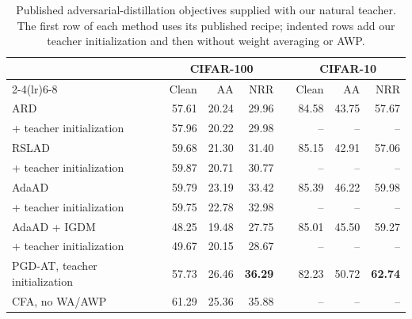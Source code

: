 \begin{table}[!htbp]
  \centering \small \setlength{\tabcolsep}{4pt}
  \caption{Published adversarial-distillation objectives supplied with our natural teacher. The first
  row of each method uses its published recipe; indented rows add our teacher initialization and then
  without weight averaging or AWP.}
  \label{tab:natteacher}
  \begin{tabular}{lrrrcrrr}
    \toprule
    & \multicolumn{3}{c}{CIFAR-100} && \multicolumn{3}{c}{CIFAR-10} \\
    \cmidrule(lr){2-4}\cmidrule(lr){6-8}
    & Clean & AA & NRR && Clean & AA & NRR \\
    \midrule
    ARD & 57.61 & 20.24 & 29.96 && 84.58 & 43.75 & 57.67 \\
    \quad + teacher initialization & 57.96 & 20.22 & 29.98 && -- & -- & -- \\
    RSLAD & 59.68 & 21.30 & 31.40 && 85.15 & 42.91 & 57.06 \\
    \quad + teacher initialization & 59.87 & 20.71 & 30.77 && -- & -- & -- \\
    AdaAD & 59.79 & 23.19 & 33.42 && 85.39 & 46.22 & 59.98 \\
    \quad + teacher initialization & 59.75 & 22.78 & 32.98 && -- & -- & -- \\
    AdaAD + IGDM & 48.25 & 19.48 & 27.75 && 85.01 & 45.50 & 59.27 \\
    \quad + teacher initialization & 49.67 & 20.15 & 28.67 && -- & -- & -- \\
    \midrule
    PGD-AT, teacher initialization & 57.73 & 26.46 & \textbf{36.29} && 82.23 & 50.72 & \textbf{62.74} \\
    CFA, no WA/AWP & 61.29 & 25.36 & 35.88 && -- & -- & -- \\
    \bottomrule
  \end{tabular}
\end{table}



